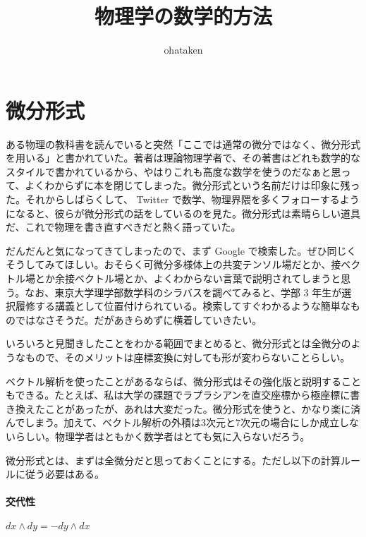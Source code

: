 \title{\huge 物理学の数学的方法}
\author{ohataken}
\maketitle

\newpage


\section{微分形式}

ある物理の教科書を読んでいると突然「ここでは通常の微分ではなく、微分形式を用いる」と書かれていた。著者は理論物理学者で、その著書はどれも数学的なスタイルで書かれているから、やはりこれも高度な数学を使うのだなぁと思って、よくわからずに本を閉じてしまった。微分形式という名前だけは印象に残った。それからしばらくして、 Twitter で数学、物理界隈を多くフォローするようになると、彼らが微分形式の話をしているのを見た。微分形式は素晴らしい道具だ、これで物理を書き直すべきだと熱く語っていた。

だんだんと気になってきてしまったので、まず Google で検索した。ぜひ同じくそうしてみてほしい。おそらく可微分多様体上の共変テンソル場だとか、接ベクトル場とか余接ベクトル場とか、よくわからない言葉で説明されてしまうと思う。なお、東京大学理学部数学科のシラバスを調べてみると、学部 3 年生が選択履修する講義として位置付けられている。検索してすぐわかるような簡単なものではなさそうだ。だがあきらめずに横着していきたい。

いろいろと見聞きしたことをわかる範囲でまとめると、微分形式とは全微分のようなもので、そのメリットは座標変換に対しても形が変わらないことらしい。

ベクトル解析を使ったことがあるならば、微分形式はその強化版と説明することもできる。たとえば、私は大学の課題でラプラシアンを直交座標から極座標に書き換えたことがあったが、あれは大変だった。微分形式を使うと、かなり楽に済んでしまう。加えて、ベクトル解析の外積は3次元と7次元の場合にしか成立しないらしい。物理学者はともかく数学者はとても気に入らないだろう。

\hrulefill

微分形式とは、まずは全微分だと思っておくことにする。ただし以下の計算ルールに従う必要はある。

\paragraph{交代性}

$ d x \wedge d y = - d y \wedge d x $


